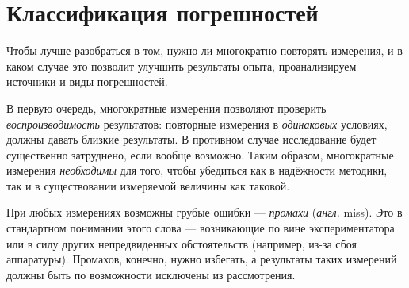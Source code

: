 %


\section{Классификация погрешностей}

Чтобы лучше разобраться в том, нужно ли многократно повторять измерения,
и в каком случае это позволит улучшить результаты опыта,
проанализируем источники и виды погрешностей.

В первую очередь, многократные измерения позволяют проверить
\emph{воспроизводимость} результатов: повторные измерения в \emph{одинаковых}
условиях, должны давать близкие результаты. В противном случае
исследование будет существенно затруднено, если вообще возможно.
Таким образом, многократные измерения \emph{необходимы} для того,
чтобы убедиться как в надёжности методики, так и в существовании измеряемой
величины как таковой.

При любых измерениях возможны грубые ошибки --- \emph{промахи}
(\emph{англ.} miss). Это  в стандартном
понимании этого слова --- возникающие по вине экспериментатора
или в силу других непредвиденных обстоятельств (например, из-за сбоя
аппаратуры). Промахов, конечно, нужно избегать, а результаты таких
измерений должны быть по возможности исключены из рассмотрения.

